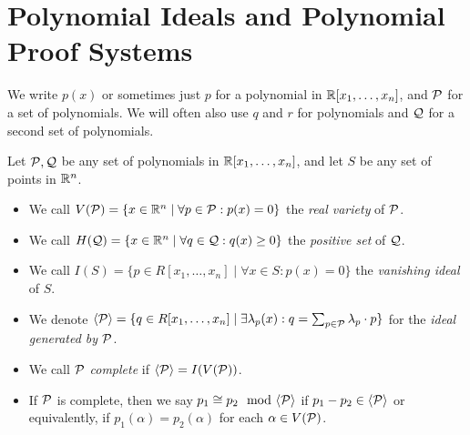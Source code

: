\section{Polynomial Ideals and Polynomial Proof Systems}\label{sec:polyproofs}
We write $p(x)$ or sometimes just $p$ for a polynomial in $\mathbb R[x_1,\dots,x_n]$, and $\mathcal P$ for a set of polynomials.
We will often also use $q$ and $r$ for polynomials and $\mathcal Q$ for a second set of polynomials. 
\begin{definition}
Let $\mathcal P,\mathcal Q$ be any set of polynomials in $\mathbb R[x_1,\dots,x_n]$, and let $S$ be any set of points in $\mathbb R^n$.
\begin{itemize}
\item We call $V(\mathcal P) = \{x \in \mathbb R^n \mid \forall p \in \mathcal P: p(x) = 0\}$ the \emph{real variety} of $\mathcal P$. 
\item We call $H(\mathcal Q) = \{x \in \mathbb R^n \mid \forall q \in \mathcal Q: q(x) \geq 0\}$ the \emph{positive set} of $\mathcal Q$.
\item We call $I(S) = \{p \in R[x_1,\dots,x_n] \mid \forall x \in S: p(x) = 0\}$ the \emph{vanishing ideal} of $S$.
\item We denote $\langle \mathcal P \rangle = \{q \in R[x_1,\dots,x_n] \mid \exists \lambda_p(x): q = \sum_{p \in \mathcal P} \lambda_p \cdot p\}$ for the \emph{ideal generated by $\mathcal P$}.
\item We call $\mathcal P$ \emph{complete} if $\langle \mathcal P \rangle = I(V(\mathcal P))$.
\item If $\mathcal P$ is complete, then we say $p_1 \cong p_2 \mod \gen{\cP}$ if $p_1 - p_2 \in \langle \mathcal P \rangle$ or equivalently, if $p_1(\alpha) = p_2(\alpha)$ for each $\alpha \in V(\mathcal P)$.
\end{itemize}
\end{definition}

